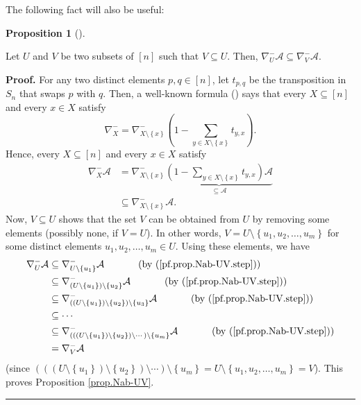 \documentclass[numbers=enddot,12pt,final,onecolumn,notitlepage]{scrartcl}%
\numberwithin{exer}{subsection}
\theoremstyle{definition}
\newtheorem{prop}[theo]{Proposition}
\newenvironment{proposition}[1][]
{\begin{prop}[#1]\begin{leftbar}}
{\end{leftbar}\end{prop}}
\newenvironment{proof}[1][Proof]{\noindent\textbf{#1.} }{\ \rule{0.5em}{0.5em}}
\let\sumnonlimits\sum
\renewcommand{\sum}{\sumnonlimits\limits}
\begin{document}
The following fact will also be useful:

\begin{proposition}
\label{prop.Nab-UV}Let $U$ and $V$ be two subsets of $\left[  n\right]  $ such
that $V\subseteq U$. Then, $\nabla_{U}^{-}\mathcal{A}\subseteq\nabla_{V}%
^{-}\mathcal{A}$.
\end{proposition}

\begin{proof}
For any two distinct elements $p,q\in\left[  n\right]  $, let $t_{p,q}$ be the
transposition in $S_{n}$ that swaps $p$ with $q$. Then, a well-known formula
(\cite[Lemma 3.11.6]{sga}) says that every $X\subseteq\left[  n\right]  $ and
every $x\in X$ satisfy%
\[
\nabla_{X}^{-}=\nabla_{X\setminus\left\{  x\right\}  }^{-}\left(  1-\sum_{y\in
X\setminus\left\{  x\right\}  }t_{y,x}\right)  .
\]
Hence, every $X\subseteq\left[  n\right]  $ and every $x\in X$ satisfy%
\begin{align}
\nabla_{X}^{-}\mathcal{A}  &  =\nabla_{X\setminus\left\{  x\right\}  }%
^{-}\underbrace{\left(  1-\sum_{y\in X\setminus\left\{  x\right\}  }%
t_{y,x}\right)  \mathcal{A}}_{\subseteq\mathcal{A}}\nonumber\\
&  \subseteq\nabla_{X\setminus\left\{  x\right\}  }^{-}\mathcal{A}.
\label{pf.prop.Nab-UV.step}%
\end{align}
Now, $V\subseteq U$ shows that the set $V$ can be obtained from $U$ by
removing some elements (possibly none, if $V=U$). In other words,
$V=U\setminus\left\{  u_{1},u_{2},\ldots,u_{m}\right\}  $ for some distinct
elements $u_{1},u_{2},\ldots,u_{m}\in U$. Using these elements, we have%
\begin{align*}
\nabla_{U}^{-}\mathcal{A}  &  \subseteq\nabla_{U\setminus\left\{
u_{1}\right\}  }^{-}\mathcal{A}\ \ \ \ \ \ \ \ \ \ \left(  \text{by
(\ref{pf.prop.Nab-UV.step})}\right) \\
&  \subseteq\nabla_{\left(  U\setminus\left\{  u_{1}\right\}  \right)
\setminus\left\{  u_{2}\right\}  }^{-}\mathcal{A}\ \ \ \ \ \ \ \ \ \ \left(
\text{by (\ref{pf.prop.Nab-UV.step})}\right) \\
&  \subseteq\nabla_{\left(  \left(  U\setminus\left\{  u_{1}\right\}  \right)
\setminus\left\{  u_{2}\right\}  \right)  \setminus\left\{  u_{3}\right\}
}^{-}\mathcal{A}\ \ \ \ \ \ \ \ \ \ \left(  \text{by
(\ref{pf.prop.Nab-UV.step})}\right) \\
&  \subseteq\cdots\\
&  \subseteq\nabla_{\left(  \left(  \left(  U\setminus\left\{  u_{1}\right\}
\right)  \setminus\left\{  u_{2}\right\}  \right)  \setminus\cdots\right)
\setminus\left\{  u_{m}\right\}  }^{-}\mathcal{A}\ \ \ \ \ \ \ \ \ \ \left(
\text{by (\ref{pf.prop.Nab-UV.step})}\right) \\
&  =\nabla_{V}^{-}\mathcal{A}%
\end{align*}
(since $\left(  \left(  \left(  U\setminus\left\{  u_{1}\right\}  \right)
\setminus\left\{  u_{2}\right\}  \right)  \setminus\cdots\right)
\setminus\left\{  u_{m}\right\}  =U\setminus\left\{  u_{1},u_{2},\ldots
,u_{m}\right\}  =V$). This proves Proposition \ref{prop.Nab-UV}.
\end{proof}
\end{document}
